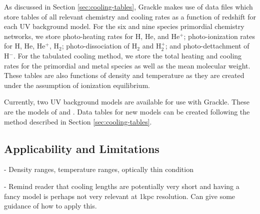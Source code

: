 As discussed in Section \ref{sec:cooling-tables}, Grackle makes use of
data files which store tables of all relevant chemistry and cooling
rates as a function of redshift for each UV background model.  For the
six and nine species primordial chemistry networks, we store
photo-heating rates for H, He, and He$^{+}$; photo-ionization rates
for H, He, He$^{+}$, H$_{2}$; photo-dissociation of H$_{2}$ and
H$_{2}^{+}$; and photo-dettachment of H$^{-}$.  For the tabulated
cooling method, we store the total heating and cooling rates for the
primordial and metal species as well as the mean molecular weight.
These tables are also functions of density and temperature as they are
created under the assumption of ionization equilibrium.

Currently, two UV background models are available for use with
Grackle.  These are the models of \citet{2009ApJ...703.1416F} and
\citet{2012ApJ...746..125H}.  Data tables for new models can be
created following the method described in Section
\ref{sec:cooling-tables}.

\subsection{Applicability and Limitations}
- Density ranges, temperature ranges, optically thin condition

- Remind reader that cooling lengths are potentially very short and
having a fancy model is perhaps not very relevant at 1kpc
resolution. Can give some guidance of how to apply this.
